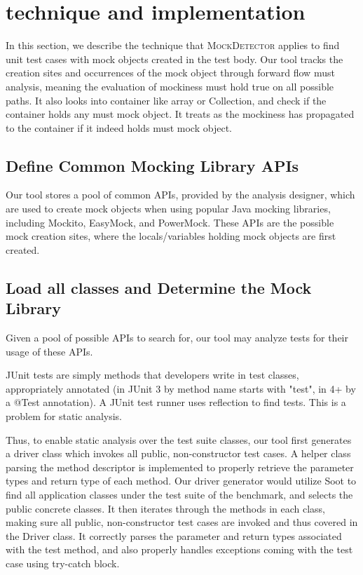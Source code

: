 \section{technique and implementation}
\label{sec:technique}

In this section, we describe the technique that \textsc{MockDetector} applies to find unit test cases with mock objects created in the test body. Our tool tracks the creation sites and occurrences of the mock object through forward flow must analysis, meaning the evaluation of mockiness must hold true on all possible paths. It also looks into container like array or Collection, and check if the container holds any must mock object. It treats as the mockiness has propagated to the container if it indeed holds must mock object.

\subsection{Define Common Mocking Library APIs}
\label{subsec:collection}

Our tool stores a pool of common APIs, provided by the analysis designer, which are used to create mock objects when using popular Java mocking libraries, including Mockito, EasyMock, and PowerMock. These APIs are the possible mock creation sites, where the locals/variables holding mock objects are first created.

\subsection{Load all classes and Determine the Mock Library}
\label{subsec:library}

Given a pool of possible APIs to search for, our tool may analyze tests for their usage of these APIs.%

JUnit tests are simply methods that developers write in test classes, appropriately annotated (in JUnit 3 by method name starts with "test", in 4+ by a @Test annotation). A JUnit test runner uses reflection to find tests. This is a problem for static analysis.


Thus, to enable static analysis over the test suite classes, our tool first generates a driver class which invokes all public, non-constructor test cases. 
A helper class parsing the method descriptor is implemented to properly retrieve the parameter types and return type of each method. Our driver generator would utilize Soot to find all application classes under the test suite of the benchmark, and selects the public concrete classes. It then iterates through the methods in each class, making sure all public, non-constructor test cases are invoked and thus covered in the Driver class. It correctly parses the parameter and return types associated with the test method, and also properly handles exceptions coming with the test case using try-catch block. 

